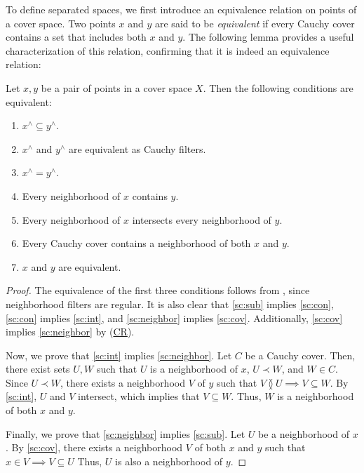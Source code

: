 \documentclass[reqno]{amsart}
\newcommand{\axref}[1]{(\hyperref[ax:#1]{#1})}
\theoremstyle{definition}
\theoremstyle{remark}
\numberwithin{figure}{section}
\newcommand{\overlap}[2]{#1 \between #2}
\newcommand{\rb}{\prec}
\begin{document}
To define separated spaces, we first introduce an equivalence relation on points of a cover space.
Two points $x$ and $y$ are said to be \emph{equivalent} if every Cauchy cover contains a set that includes both $x$ and $y$.
The following lemma provides a useful characterization of this relation, confirming that it is indeed an equivalence relation:

\begin{lem}
Let $x,y$ be a pair of points in a cover space $X$.
Then the following conditions are equivalent:
\begin{enumerate}
\item \label{sc:sub} $x^\wedge \subseteq y^\wedge$.
\item $x^\wedge$ and $y^\wedge$ are equivalent as Cauchy filters.
\item $x^\wedge = y^\wedge$.
\item \label{sc:con} Every neighborhood of $x$ contains $y$.
\item \label{sc:int} Every neighborhood of $x$ intersects every neighborhood of $y$.
\item \label{sc:neighbor} Every Cauchy cover contains a neighborhood of both $x$ and $y$.
\item \label{sc:cov} $x$ and $y$ are equivalent.
\end{enumerate}
\end{lem}
\begin{proof}
The equivalence of the first three conditions follows from , since neighborhood filters are regular.
It is also clear that \eqref{sc:sub} implies \eqref{sc:con}, \eqref{sc:con} implies \eqref{sc:int}, and \eqref{sc:neighbor} implies \eqref{sc:cov}.
Additionally, \eqref{sc:cov} implies \eqref{sc:neighbor} by \axref{CR}.

Now, we prove that \eqref{sc:int} implies \eqref{sc:neighbor}.
Let $C$ be a Cauchy cover.
Then, there exist sets $U,W$ such that $U$ is a neighborhood of $x$, $U \rb W$, and $W \in C$.
Since $U \rb W$, there exists a neighborhood $V$ of $y$ such that $\overlap{V}{U} \implies V \subseteq W$.
By \eqref{sc:int}, $U$ and $V$ intersect, which implies that $V \subseteq W$.
Thus, $W$ is a neighborhood of both $x$ and $y$.

Finally, we prove that \eqref{sc:neighbor} implies \eqref{sc:sub}.
Let $U$ be a neighborhood of $x$.
By \eqref{sc:cov}, there exists a neighborhood $V$ of both $x$ and $y$ such that $x \in V \implies V \subseteq U$
Thus, $U$ is also a neighborhood of $y$.
\end{proof}
\end{document}
